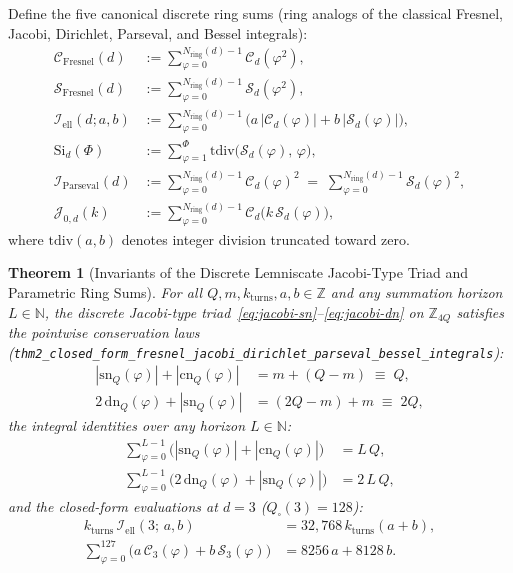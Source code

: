 \documentclass[11pt,a4paper]{article}
\theoremstyle{plain}
\newtheorem{theorem}{Theorem}[section]
\theoremstyle{definition}
\begin{document}
Define the five canonical discrete ring sums (ring analogs of the classical Fresnel, Jacobi, Dirichlet, Parseval, and Bessel integrals):
\begin{align}
  \mathcal{C}_{\mathrm{Fresnel}}(d) &:= \sum_{\varphi=0}^{N_{\mathrm{ring}}(d)-1}\mathcal{C}_d(\varphi^2), \label{eq:def-fresnel-c} \\
  \mathcal{S}_{\mathrm{Fresnel}}(d) &:= \sum_{\varphi=0}^{N_{\mathrm{ring}}(d)-1}\mathcal{S}_d(\varphi^2), \label{eq:def-fresnel-s} \\
  \mathcal{I}_{\mathrm{ell}}(d; a, b) &:= \sum_{\varphi=0}^{N_{\mathrm{ring}}(d)-1}\bigl(a\,|\mathcal{C}_d(\varphi)| + b\,|\mathcal{S}_d(\varphi)|\bigr), \label{eq:def-elliptic} \\
  \mathrm{Si}_d(\Phi) &:= \sum_{\varphi=1}^{\Phi}\mathrm{tdiv}\bigl(\mathcal{S}_d(\varphi),\, \varphi\bigr), \label{eq:def-dirichlet} \\
  \mathcal{I}_{\mathrm{Parseval}}(d) &:= \sum_{\varphi=0}^{N_{\mathrm{ring}}(d)-1}\mathcal{C}_d(\varphi)^2 \;=\; \sum_{\varphi=0}^{N_{\mathrm{ring}}(d)-1}\mathcal{S}_d(\varphi)^2, \label{eq:def-parseval} \\
  \mathcal{J}_{0,d}(k) &:= \sum_{\varphi=0}^{N_{\mathrm{ring}}(d)-1}\mathcal{C}_d\bigl(k\,\mathcal{S}_d(\varphi)\bigr), \label{eq:def-bessel}
\end{align}
where $\mathrm{tdiv}(a, b)$ denotes integer division truncated toward zero.

\begin{theorem}[Invariants of the Discrete Lemniscate Jacobi-Type Triad and Parametric Ring Sums]
\label{thm:main-2}
For all $Q, m, k_{\mathrm{turns}}, a, b \in \mathbb{Z}$ and any summation horizon $L \in \mathbb{N}$, the discrete Jacobi-type triad~\eqref{eq:jacobi-sn}--\eqref{eq:jacobi-dn} on $\mathbb{Z}_{4Q}$ satisfies the pointwise conservation laws (\texttt{thm2\_closed\_form\_fresnel\_jacobi\_dirichlet\_parseval\_bessel\_integrals}):
\begin{align}
  |\mathrm{sn}_Q(\varphi)| + |\mathrm{cn}_Q(\varphi)| &= m + (Q - m) \;\equiv\; Q, \label{eq:jacobi-inv-1} \\
  2\,\mathrm{dn}_Q(\varphi) + |\mathrm{sn}_Q(\varphi)| &= (2Q - m) + m \;\equiv\; 2Q, \label{eq:jacobi-inv-2}
\end{align}
the integral identities over any horizon $L \in \mathbb{N}$:
\begin{align}
  \sum_{\varphi=0}^{L-1}\bigl(|\mathrm{sn}_Q(\varphi)| + |\mathrm{cn}_Q(\varphi)|\bigr) &= L\,Q, \label{eq:jacobi-int-1} \\
  \sum_{\varphi=0}^{L-1}\bigl(2\,\mathrm{dn}_Q(\varphi) + |\mathrm{sn}_Q(\varphi)|\bigr) &= 2\,L\,Q, \label{eq:jacobi-int-2}
\end{align}
and the closed-form evaluations at $d = 3$ ($Q_\square(3) = 128$):
\begin{align}
  k_{\mathrm{turns}}\,\mathcal{I}_{\mathrm{ell}}(3;\, a, b) &= 32,768\,k_{\mathrm{turns}}(a + b), \label{eq:parametric-elliptic-full} \\
  \sum_{\varphi=0}^{127}\bigl(a\,\mathcal{C}_3(\varphi) + b\,\mathcal{S}_3(\varphi)\bigr) &= 8256\,a + 8128\,b. \label{eq:parametric-elliptic-quad}
\end{align}
\end{theorem}
\end{document}
